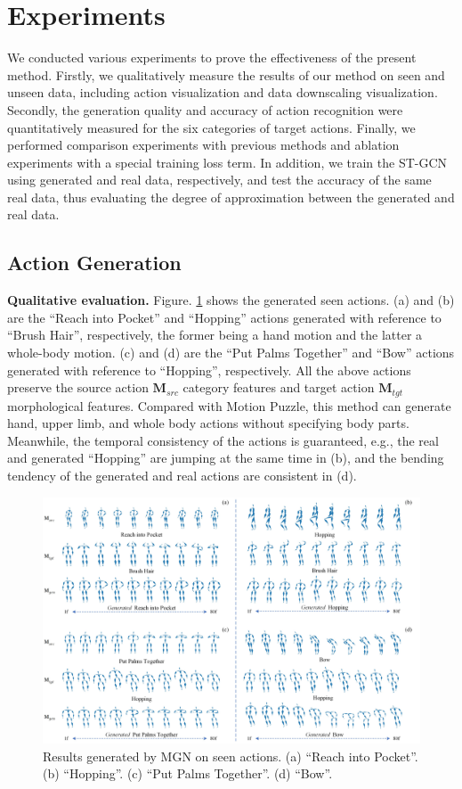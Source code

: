 

\section{Experiments}

We conducted various experiments to prove the effectiveness of the present method. 
Firstly, we qualitatively measure the results of our method on seen and unseen data, including action visualization and data downscaling visualization. 
Secondly, the generation quality and accuracy of action recognition were quantitatively measured for the six categories of target actions.
Finally, we performed comparison experiments with previous methods and ablation experiments with a special training loss term.
In addition, we train the ST-GCN using generated and real data, respectively, and test the accuracy of the same real data, thus evaluating the degree of approximation between the generated and real data. 

\subsection{Action Generation}

\textbf{Qualitative evaluation. }
Figure. \ref{fig:4} shows the generated seen actions. 
(a) and (b) are the “Reach into Pocket” and “Hopping” actions generated with reference to “Brush Hair”, respectively, the former being a hand motion and the latter a whole-body motion. 
(c) and (d) are the “Put Palms Together” and “Bow” actions generated with reference to “Hopping”, respectively. 
All the above actions preserve the source action $\textbf{M}_{src}$ category features and target action $\textbf{M}_{tgt}$ morphological features. 
Compared with Motion Puzzle, this method can generate hand, upper limb, and whole body actions without specifying body parts. 
Meanwhile, the temporal consistency of the actions is guaranteed, e.g., the real and generated “Hopping” are jumping at the same time in (b), and the bending tendency of the generated and real actions are consistent in (d). 

\begin{figure}[htpb]
  \centering
   \includegraphics[width=0.75\linewidth]{figures/Fig4.jpg}

   \caption{Results generated by MGN on seen actions. (a) “Reach into Pocket”. (b) “Hopping”. (c) “Put Palms Together”. (d) “Bow”.}
   \label{fig:4}
\end{figure}

